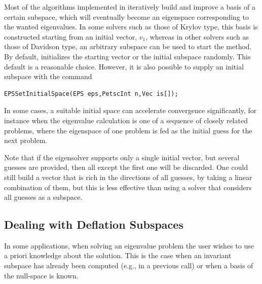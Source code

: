 	Most of the algorithms implemented in  iteratively build and improve a basis of a certain subspace, which will eventually become an eigenspace corresponding to the wanted eigenvalues. In some solvers such as those of Krylov type, this basis is constructed starting from an initial vector, $v_1$, whereas in other solvers such as those of Davidson type, an arbitrary subspace can be used to start the method. By default,  initializes the starting vector or the initial subspace randomly. This default is a reasonable choice. However, it is also possible to supply an initial subspace with the command
	\begin{Verbatim}[fontsize=\small]
	EPSSetInitialSpace(EPS eps,PetscInt n,Vec is[]);
	\end{Verbatim}
In some cases, a suitable initial space can accelerate convergence significantly, for instance when the eigenvalue calculation is one of a sequence of closely related problems, where the eigenspace of one problem is fed as the initial guess for the next problem.

Note that if the eigensolver supports only a single initial vector, but several guesses are provided, then all except the first one will be discarded. One could still build a vector that is rich in the directions of all guesses, by taking a linear combination of them, but this is less effective than using a solver that considers all guesses as a subspace.

\subsection{Dealing with Deflation Subspaces}

	In some applications, when solving an eigenvalue problem the user wishes to use a priori knowledge about the solution. This is the case when an invariant subspace has already been computed (e.g., in a previous  call) or when a basis of the null-space is known.

